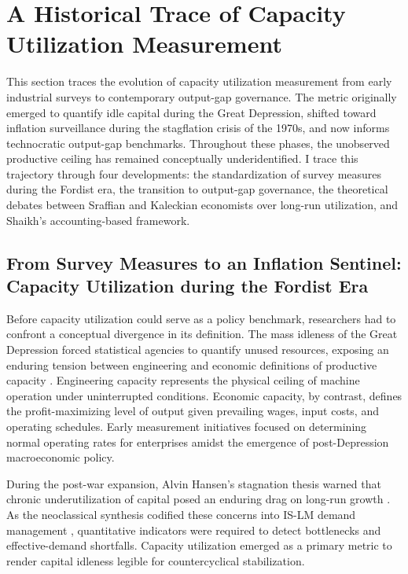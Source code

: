 \section{A Historical Trace of Capacity Utilization Measurement}
\label{sec:literature_review}

This section traces the evolution of capacity utilization measurement from early industrial surveys to contemporary output-gap governance. The metric originally emerged to quantify idle capital during the Great Depression, shifted toward inflation surveillance during the stagflation crisis of the 1970s, and now informs technocratic output-gap benchmarks. Throughout these phases, the unobserved productive ceiling has remained conceptually underidentified. I trace this trajectory through four developments: the standardization of survey measures during the Fordist era, the transition to output-gap governance, the theoretical debates between Sraffian and Kaleckian economists over long-run utilization, and Shaikh's accounting-based framework.

\subsection{From Survey Measures to an Inflation Sentinel: Capacity Utilization during the Fordist Era}
\label{subsec:fordist_survey_statecraft}

Before capacity utilization could serve as a policy benchmark, researchers had to confront a conceptual divergence in its definition. The mass idleness of the Great Depression forced statistical agencies to quantify unused resources, exposing an enduring tension between engineering and economic definitions of productive capacity \citep{Burns1954, KleinDavid1958}. Engineering capacity represents the physical ceiling of machine operation under uninterrupted conditions. Economic capacity, by contrast, defines the profit-maximizing level of output given prevailing wages, input costs, and operating schedules. Early measurement initiatives focused on determining normal operating rates for enterprises amidst the emergence of post-Depression macroeconomic policy.

During the post-war expansion, Alvin Hansen's stagnation thesis warned that chronic underutilization of capital posed an enduring drag on long-run growth \citep{Hansen1936, Hansen1941, Barber1987}. As the neoclassical synthesis codified these concerns into IS-LM demand management \citep{Hicks1937, Samuelson1947, Samuelson1948}, quantitative indicators were required to detect bottlenecks and effective-demand shortfalls. Capacity utilization emerged as a primary metric to render capital idleness legible for countercyclical stabilization.

